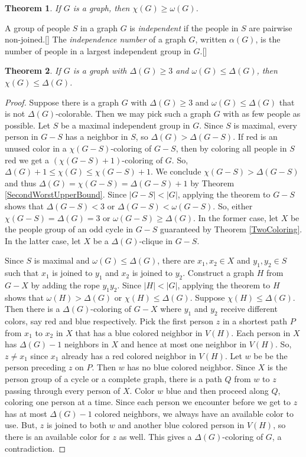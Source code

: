 \documentclass{amsbook}
\newcommand{\aaside}[2]{\marginnote{\scriptsize{#1}}[#2]}
\theoremstyle{plain}
\newtheorem{theorem}{Theorem}
\numberwithin{equation}{chapter}
\newcommand{\card}[1]{\left|#1\right|}
\newcommand{\parens}[1]{\left( #1 \right)}
\begin{document}
\begin{theorem}\label{OmegaLowerBound}
If $G$ is a graph, then $\chi(G) \ge \omega(G)$.
\end{theorem}

A group of people $S$ in a graph $G$ is \emph{independent} if the people in $S$ are pairwise non-joined.\aaside{independent}{}  
The \emph{independence number} of a graph $G$, written $\alpha(G)$, is the number of people in a largest independent group in $G$.\aaside{$\alpha(G)$}{}

\begin{theorem}
If $G$ is a graph with $\Delta(G) \ge 3$ and $\omega(G) \le \Delta(G)$, then $\chi(G) \le \Delta(G)$.
\label{BrooksTheorem}
\end{theorem}
\begin{proof}
Suppose there is a graph $G$ with $\Delta(G) \ge 3$ and $\omega(G) \le \Delta(G)$ that is not $\Delta(G)$-colorable.  
Then we may pick such a graph $G$ with as few people as possible.  Let $S$ be 
a maximal independent group in $G$.  Since $S$ is maximal, every person in $G-S$ has a neighbor in $S$, so $\Delta(G) > \Delta(G-S)$.
If red is an unused color in a $\chi(G-S)$-coloring of $G-S$, then by coloring all people in $S$ red we get a $\parens{\chi(G-S)+1}$-coloring of $G$.  
So, $\Delta(G) + 1 \le \chi(G) \le \chi(G-S) + 1$. We conclude $\chi(G-S) > \Delta(G - S)$ and thus $\Delta(G) = \chi(G-S) = \Delta(G-S) + 1$ by Theorem \ref{SecondWorstUpperBound}.
Since $\card{G-S} < \card{G}$, applying the theorem to $G-S$ shows that $\Delta(G-S) < 3$ or $\Delta(G -S) < \omega(G - S)$.  
So, either $\chi(G-S) = \Delta(G) = 3$ or $\omega(G-S) \ge \Delta(G)$.  In the former case, let $X$ be the people group of an odd cycle in $G-S$ guaranteed by Theorem \ref{TwoColoring}.  
In the latter case, let $X$ be a $\Delta(G)$-clique in $G-S$.

Since $S$ is maximal and $\omega(G) \le \Delta(G)$, there are $x_1, x_2 \in X$ and $y_1, y_2 \in S$ such that $x_1$ is joined to $y_1$ and $x_2$ is joined to $y_2$.
Construct a graph $H$ from $G-X$ by adding the rope $y_1y_2$.  Since $\card{H} < \card{G}$, applying the theorem to $H$ shows that $\omega(H) > \Delta(G)$ or $\chi(H) \le \Delta(G)$.
Suppose $\chi(H) \le \Delta(G)$.  Then there is a $\Delta(G)$-coloring of $G-X$ where $y_1$ and $y_2$ receive different colors, say red and blue respectively.
Pick the first person $z$ in a shortest path $P$ from $x_1$ to $x_2$ in $X$ that has a blue colored neighbor in $V(H)$. 
Each person in $X$ has $\Delta(G)-1$ neighbors in $X$ and hence at most one neighbor in $V(H)$.  So, $z \ne x_1$ since $x_1$ already has a red colored neighbor in $V(H)$.
Let $w$ be be the person preceding $z$ on $P$. Then $w$ has no blue colored neighbor.  Since $X$ is the person group of a cycle or a 
complete graph, there is a path $Q$ from $w$ to $z$ passing through every person of $X$.  Color $w$ blue and then proceed along $Q$, coloring one person at a time.  
Since each person we encounter before we get to $z$ has at most $\Delta(G) - 1$ colored neighbors, we always have an available color to use.  But, $z$ is joined
to both $w$ and another blue colored person in $V(H)$, so there is an available color for $z$ as well.  This gives a $\Delta(G)$-coloring of $G$, a contradiction.


\end{proof}
\end{document}
